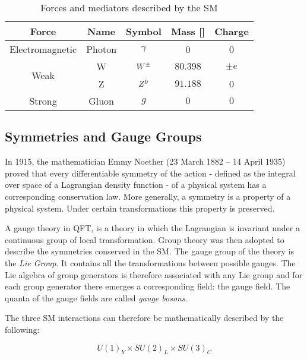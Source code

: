 				\begin{table}[!htb]\centering\caption{Forces and mediators described by the SM}							
					\begin{tabular}{c|c|c|c|c}
						\hline \hline
						Force & Name & Symbol & Mass [\GeV]& Charge \\ \hline \hline
						Electromagnetic & Photon & $\gamma$ & 0 & 0 \\ \hline
						\multirow{2}{*}{Weak} & W & $W^{\pm}$ & $80.398$ & $\pm e$ \\
						& Z & $Z^0$ & $91.188$ & 0 \\\hline
						Strong & Gluon & $g$ & $0$ & $0$ \\\hline\hline
					\end{tabular}						
				\label{tab:interactions} 
				\end{table}


			\subsection*{Symmetries and Gauge Groups}

				In 1915, the mathematician Emmy Noether (23 March 1882 – 14 April 1935) proved that every differentiable symmetry of the action - defined as the integral over space of a Lagrangian density function - of a physical system has a corresponding conservation law. More generally, a symmetry is a property of a physical system. Under certain transformations this property is preserved. 

				A gauge theory in QFT, is a theory in which the Lagrangian is invariant under a continuous group of local transformation. Group theory was then adopted to describe the symmetries conserved in the SM.  
				The gauge group of the theory is the \emph{Lie Group}. It contains all the transformations between possible gauges. The Lie algebra of group generators is therefore associated with any Lie group and for each group generator there emerges a corresponding field: the gauge field. The quanta of the gauge fields are called \emph{gauge bosons}.
				
				The three SM interactions can therefore be mathematically described by the following:

				\begin{equation}
					U(1)_Y \times SU(2)_L \times SU(3)_C
					\label{eq:SM_description}
				\end{equation}

